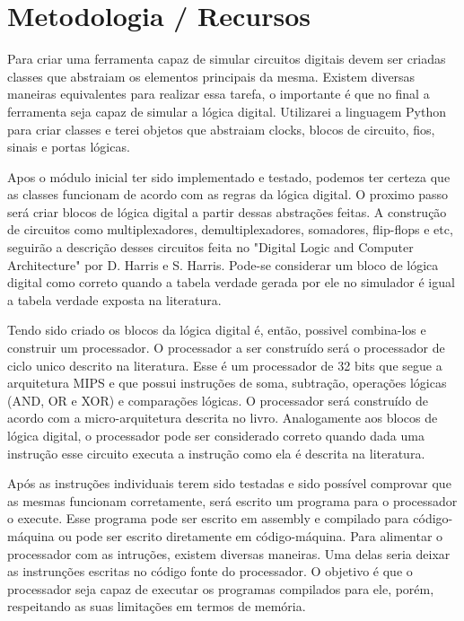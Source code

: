 \documentclass[12pt]{report}
\begin{document}
\chapter{Metodologia / Recursos}

Para criar uma ferramenta capaz de simular circuitos digitais devem ser criadas classes que abstraiam os elementos principais da mesma. Existem diversas maneiras equivalentes para realizar essa tarefa, o importante é que no final a ferramenta seja capaz de simular a lógica digital. Utilizarei a linguagem Python para criar classes e terei objetos que abstraiam clocks, blocos de circuito, fios, sinais e portas lógicas.

Apos o módulo inicial ter sido implementado e testado, podemos ter certeza que as classes funcionam de acordo com as regras da lógica digital. O proximo passo será criar blocos de lógica digital a partir dessas abstrações feitas. A construção de circuitos como multiplexadores, demultiplexadores, somadores, flip-flops e etc, seguirão a descrição desses circuitos feita no "Digital Logic and Computer Architecture" por D. Harris e S. Harris. Pode-se considerar um bloco de lógica digital como correto quando a tabela verdade gerada por ele no simulador é igual a tabela verdade exposta na literatura.

Tendo sido criado os blocos da lógica digital é, então,  possivel combina-los e construir um processador. O processador a ser construído será o processador de ciclo unico descrito na literatura. Esse é um processador de 32 bits que segue a arquitetura MIPS e que possui instruções de soma, subtração, operações lógicas (AND, OR e XOR) e comparações lógicas. O processador será construído de acordo com a micro-arquitetura descrita no livro. Analogamente aos blocos de lógica digital, o processador pode ser considerado correto quando dada uma instrução esse circuito executa a instrução como ela é descrita na literatura. 

Após as instruções individuais terem sido testadas e sido possível comprovar que as mesmas funcionam corretamente, será escrito um programa para o processador o execute. Esse programa pode ser escrito em assembly e compilado para código-máquina ou pode ser escrito diretamente em código-máquina. Para alimentar o processador com as intruções, existem diversas maneiras. Uma delas seria deixar as instrunções escritas no código fonte do processador. O objetivo é que o processador seja capaz de executar os programas compilados para ele, porém, respeitando as suas limitações em termos de memória.
\end{document}
